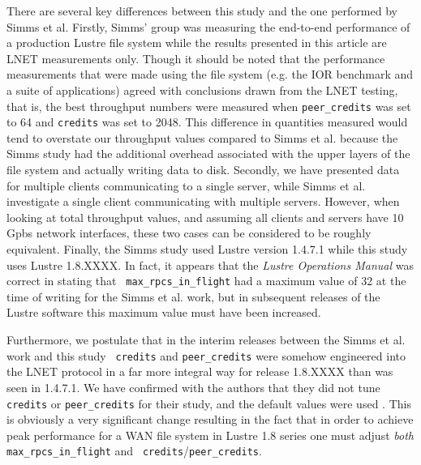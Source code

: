 \documentclass[]{sigplan-proc}
\begin{document}
There are several key differences between this study and the one performed by Simms et al. Firstly, Simms'
group was measuring the end-to-end performance of a production Lustre file system while the results presented
in this article are LNET measurements only. Though it should be noted that the performance measurements that
were made using the file system (e.g. the IOR benchmark and a suite of applications) agreed with conclusions
drawn from the LNET testing, that is, the best throughput numbers were measured when {\tt peer\_credits} was
set to 64 and {\tt credits} was set to 2048. This difference in quantities measured would tend to overstate
our throughput values compared to Simms et al. because the Simms study had the additional overhead associated
with the upper layers of the file system and actually writing data to disk. Secondly, we have presented data
for multiple clients communicating to a single server, while Simms et al. investigate a single client
communicating with multiple servers. However, when looking at total throughput values, and assuming all
clients and servers have 10 Gpbs network interfaces, these two cases can be considered to be roughly
equivalent. Finally, the Simms study used Lustre version 1.4.7.1 while this study uses Lustre 1.8.XXXX. In
fact, it appears that the {\it Lustre Operations Manual} was correct in stating that {\tt
  max\_rpcs\_in\_flight} had a maximum value of 32 at the time of writing for the Simms et al. work, but in
subsequent releases of the Lustre software this maximum value must have been increased.

Furthermore, we postulate that in the interim releases between the Simms et al. work and this study {\tt
  credits} and {\tt peer\_credits} were somehow engineered into the LNET protocol in a far more integral way
for release 1.8.XXXX than was seen in 1.4.7.1. We have confirmed with the authors that they did not tune {\tt
  credits} or {\tt peer\_credits} for their study, and the default values were used \cite{simmsprivate}. This
is obviously a very significant change resulting in the fact that in order to achieve peak performance for a
WAN file system in Lustre 1.8 series one must adjust {\it both} {\tt max\_rpcs\_in\_flight} and {\tt
  credits}/{\tt peer\_credits}.
\end{document}
